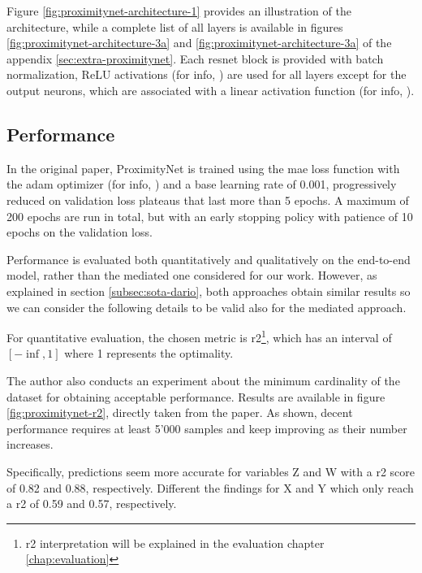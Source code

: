 Figure \ref{fig:proximitynet-architecture-1} provides an illustration of the architecture, while a complete list of all layers is available in figures \ref{fig:proximitynet-architecture-3a} and \ref{fig:proximitynet-architecture-3a} of the appendix \ref{sec:extra-proximitynet}. Each \gls{resnet} block is provided with batch normalization, ReLU activations (for info, \cite{act-relu}) are used for all layers except for the output neurons, which are associated with a linear activation function (for info, \cite{act-linear}). 



\subsection{Performance}
\label{subsec:proximitynet-performance}

In the original paper, ProximityNet is trained using the \gls{mae} loss function with the \gls{adam} optimizer (for info, \cite{kingma2014adam}) and a base learning rate of 0.001, progressively reduced on validation loss plateaus that last more than 5 epochs. A maximum of 200 epochs are run in total, but with an early stopping policy with patience of 10 epochs on the validation loss. 

Performance is evaluated both quantitatively and qualitatively on the end-to-end model, rather than the mediated one considered for our work. However, as explained in section \ref{subsec:sota-dario}, both approaches obtain similar results so we can consider the following details to be valid also for the mediated approach.

\medskip 

For quantitative evaluation, the chosen metric is \gls{r2}\footnote{\gls{r2} interpretation will be explained in the evaluation chapter \ref{chap:evaluation}}, which has an interval of $[-\inf, 1]$ where 1 represents the optimality. 

The author also conducts an experiment about the minimum cardinality of the dataset for obtaining acceptable performance. Results are available in figure \ref{fig:proximitynet-r2}, directly taken from the paper. As shown, decent performance requires at least 5'000 samples and keep improving as their number increases.

Specifically, predictions seem more accurate for variables Z and W with a \gls{r2} score of 0.82 and 0.88, respectively. Different the findings for X and Y which only reach a \gls{r2} of 0.59 and 0.57, respectively.

